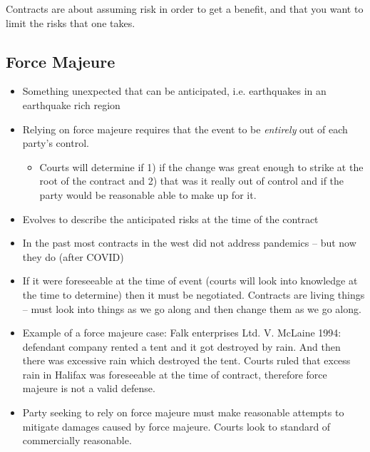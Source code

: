 \documentclass[10pt]{article}
\begin{document}
Contracts are about assuming risk in order to get a benefit, and that you want to limit the risks that one takes.

\subsection{Force Majeure}
\begin{itemize}
	\item Something unexpected that can be anticipated, i.e. earthquakes in an earthquake rich region
	\item Relying on force majeure requires that the event to be \textit{entirely} out of each party's control.
		\begin{itemize}
			\item Courts will determine if 1) if the change was great enough to strike at the root of the contract and 2) that was it really out of control and if the party would be reasonable able to make up for it.
		\end{itemize}
	\item Evolves to describe the anticipated risks at the time of the contract
	\item In the past most contracts in the west did not address pandemics -- but now they do (after COVID)
	\item If it were foreseeable at the time of event (courts will look into knowledge at the time to determine) then it must be negotiated. Contracts are living things -- must look into things as we go along and then change them as we go along.
	\item Example of a force majeure case: Falk enterprises Ltd. V. McLaine 1994: defendant company rented a tent and it got destroyed by rain. And then there was excessive rain which destroyed the tent. Courts ruled that excess rain in Halifax was foreseeable at the time of contract, therefore force majeure is not a valid defense. 
	\item Party seeking to rely on force majeure must make reasonable attempts to mitigate damages caused by force majeure. Courts look to standard of commercially reasonable.

\end{itemize}
\end{document}
